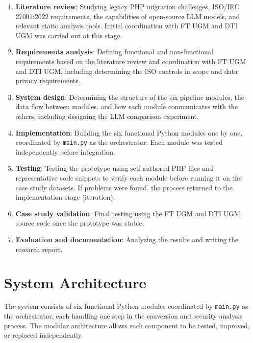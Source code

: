 \begin{enumerate}

    \item \begin{sloppypar}\textbf{Literature review}: Studying legacy PHP migration challenges, ISO/IEC 27001:2022 requirements, the capabilities of open-source LLM models, and relevant static analysis tools. Initial coordination with FT UGM and DTI UGM was carried out at this stage.\end{sloppypar}

    \item \textbf{Requirements analysis}: Defining functional and non-functional requirements based on the literature review and coordination with FT UGM and DTI UGM, including determining the ISO controls in scope and data privacy requirements.

    \item \textbf{System design}: Determining the structure of the six pipeline modules, the data flow between modules, and how each module communicates with the others, including designing the LLM comparison experiment.

    \item \textbf{Implementation}: Building the six functional Python modules one by one, coordinated by \texttt{main.py} as the orchestrator. Each module was tested independently before integration.

    \item \textbf{Testing}: Testing the prototype using self-authored PHP files and representative code snippets to verify each module before running it on the case study datasets. If problems were found, the process returned to the implementation stage (iteration).

    \item \textbf{Case study validation}: Final testing using the FT UGM and DTI UGM source code once the prototype was stable.

    \item \textbf{Evaluation and documentation}: Analyzing the results and writing the research report.

\end{enumerate}

\section{System Architecture}

The system consists of six functional Python modules coordinated by \texttt{main.py} as the orchestrator, each handling one step in the conversion and security analysis process. The modular architecture allows each component to be tested, improved, or replaced independently.

